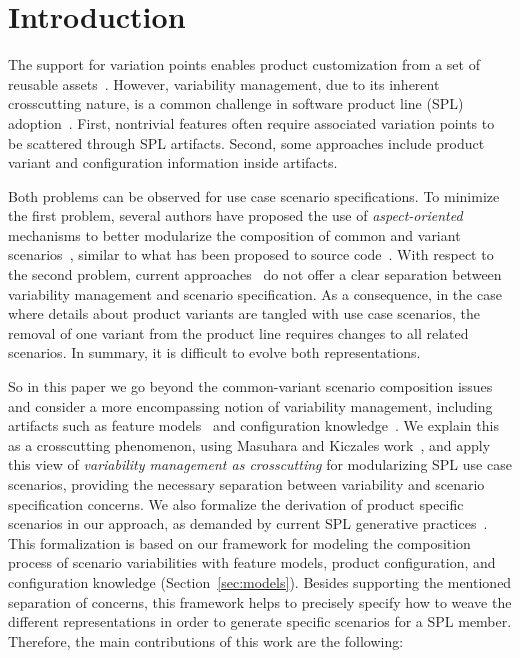 \documentclass{acm_proc_article-sp}
\begin{document}


\section{Introduction}
The support for variation points enables product customization from a set of
reusable assets~\cite{Pohl:2005aa}. However, variability management, due to its
inherent crosscutting nature, is a common challenge in software product line
(SPL) adoption~\cite{Clements:2001aa,Pohl:2005aa}. First, nontrivial features
often require associated variation points to be scattered through SPL artifacts.
Second, some approaches include product variant and configuration information
inside artifacts.

Both problems can be observed for use case scenario specifications. To minimize
the first problem, several authors have proposed the use of
\emph{aspect-oriented} mechanisms to better modularize the composition of common
and variant scenarios~\cite{moreira-re07,eriksson-splc-2005,pohl-caise-2005},
similar to what has been proposed to source code~\cite{alves-gpce-06,
apel-icse2006}. With respect to the second problem, current
approaches~\cite{favaro-icsr-98,Bertolino:2003aa,Eriksson:2005aa} do not offer a
clear separation between variability management and scenario specification. As a
consequence, in the case where details about product variants are tangled with
use case scenarios, the removal of one variant from the product line requires
changes to all related scenarios. In summary, it is difficult to evolve both
representations.

So in this paper we go beyond the common-variant scenario composition issues and
consider a more encompassing notion of variability management, including
artifacts such as feature models~\cite{gheyi-alloy-06,Czarnecki:2000aa} and
configuration knowledge~\cite{Czarnecki:2000aa,Pohl:2005aa}. We explain this as a
crosscutting phenomenon, using Masuhara and Kiczales work~\cite{Masuhara:2003aa},
and apply this view of \emph{variability management as crosscutting} for
modularizing SPL use case scenarios, providing the necessary separation between
variability and scenario specification concerns. We also formalize the derivation
of product specific scenarios in our approach, as demanded by current SPL
generative practices~\cite{krueger-cacm-200712}. This formalization is based on
our framework for modeling the composition process of scenario variabilities with
feature models, product configuration, and configuration knowledge
(Section~\ref{sec:models}). Besides supporting the mentioned separation of
concerns, this framework helps to precisely specify how to weave the different
representations in order to generate specific scenarios for a SPL member.
Therefore, the main contributions of this work are the following:
\end{document}
